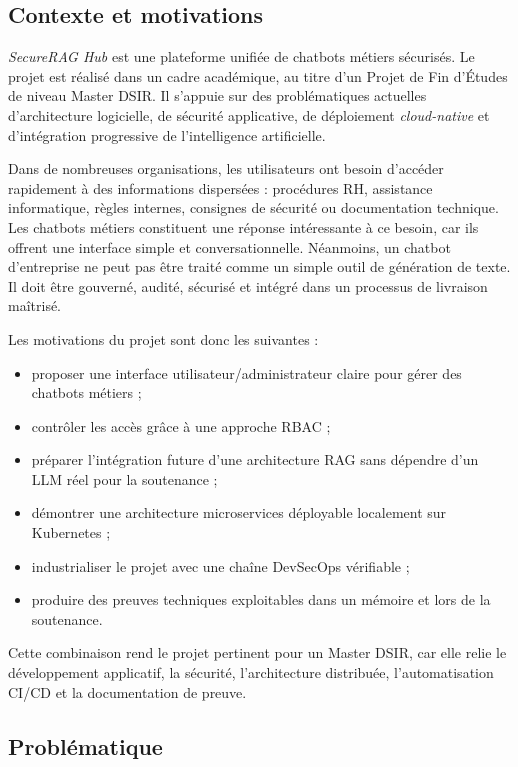 \subsection{Contexte et motivations}

\textit{SecureRAG Hub} est une plateforme unifiée de chatbots métiers sécurisés. Le projet est réalisé dans un cadre académique, au titre d'un Projet de Fin d'Études de niveau Master DSIR. Il s'appuie sur des problématiques actuelles d'architecture logicielle, de sécurité applicative, de déploiement \textit{cloud-native} et d'intégration progressive de l'intelligence artificielle.

Dans de nombreuses organisations, les utilisateurs ont besoin d'accéder rapidement à des informations dispersées : procédures RH, assistance informatique, règles internes, consignes de sécurité ou documentation technique. Les chatbots métiers constituent une réponse intéressante à ce besoin, car ils offrent une interface simple et conversationnelle. Néanmoins, un chatbot d'entreprise ne peut pas être traité comme un simple outil de génération de texte. Il doit être gouverné, audité, sécurisé et intégré dans un processus de livraison maîtrisé.

Les motivations du projet sont donc les suivantes :

\begin{itemize}
    \item proposer une interface utilisateur/administrateur claire pour gérer des chatbots métiers ;
    \item contrôler les accès grâce à une approche RBAC ;
    \item préparer l'intégration future d'une architecture RAG sans dépendre d'un LLM réel pour la soutenance ;
    \item démontrer une architecture microservices déployable localement sur Kubernetes ;
    \item industrialiser le projet avec une chaîne DevSecOps vérifiable ;
    \item produire des preuves techniques exploitables dans un mémoire et lors de la soutenance.
\end{itemize}

Cette combinaison rend le projet pertinent pour un Master DSIR, car elle relie le développement applicatif, la sécurité, l'architecture distribuée, l'automatisation CI/CD et la documentation de preuve.

\subsection{Problématique}

